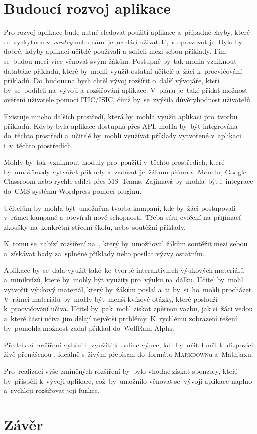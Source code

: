 \documentclass[14pt,a4paper]{article}
\begin{document}
	\section{Budoucí rozvoj aplikace}
        Pro rozvoj aplikace bude nutné sledovat použití aplikace a~případné chyby, které se~vyskytnou v~\emph{sentry} nebo nám~je~nahlásí uživatelé, a~opravovat je.
        Bylo by dobré, kdyby aplikaci učitelé používali a~sdíleli mezi sebou příklady. Tím se~budou moci více věnovat svým žákům. Postupně by~tak mohla vzniknout databáze příkladů, které by~mohli využít ostatní učitelé a~žáci k~procvičování příkladů.
        Do~budoucna bych chtěl vývoj rozšířit o~další vývojáře, kteří by~se~podíleli na~vývoji a~rozšiřování aplikace. V~plánu je~také přidat možnost ověření uživatele pomocí ITIC/ISIC, čímž by~se~zvýšila důvěryhodnost uživatelů.
        
        Existuje mnoho dalších prostředí, která by~mohla využít aplikaci pro~tvorbu příkladů. Kdyby byla aplikace dostupná přes API, mohla by~být integrována do~těchto prostředí a~učitelé by~mohli využívat příklady vytvořené v~aplikaci i~v~těchto prostředích.
        
        Mohly by~tak~vzniknout moduly pro~použití v~těchto prostředích, které by~umožňovaly vytvářet příklady a~zadávat je~žákům přímo v~Moodlu, Google Classroom nebo rychle sdílet přes MS~Teams. Zajímavá by~mohla~být i~integrace do~CMS systému Wordpress pomocí pluginu.

        Učitelům by~mohla být~umožněna tvorba kampaní, kde by~žáci postupovali v~rámci kampaně a~otevírali nové schopnosti. Třeba sérii cvičení na~přijímací zkoušky na~konkrétní střední školu, nebo~soutěžní příklady.
        
        K~tomu se~nabízí rozšíření na~, který by~umožňoval žákům soutěžit mezi sebou a~získávat body za~splněné příklady nebo posílat výzvy ostatním.

        Aplikace by~se~dala využít také~ke~tvorbě interaktivních výukových materiálů a~minikvízů, které by~mohly být využity pro~výuku na~dálku. Učitel by~mohl vytvořit výukový materiál, který by~žákům poslal a~ti~by~si~ho~mohli procházet. V~rámci materiálů by~mohly být~menší kvízové otázky, které poslouží k~procvičování učiva. Učitel by~pak~mohl získat zpětnou vazbu, jak si~žáci vedou a~které části učiva jim dělají největší problémy. K~rychlému zobrazení řešení by~pomohla možnost zadat příklad do~WolfRam Alpha. 
        
        Předchozí rozšíření vybízí k~využítí k~online výuce, kde by~učitel měl~k~dispozici živě přenášenou , ideálně s~živým přepisem do~formátu \textsc{Markdown}u a~Mathjaxu.

        Pro~realizaci výše zmíněných rozšíření by~bylo vhodné získat sponzory, kteří by~přispěli k~vývoji aplikace, což~by~umožnilo věnovat se~vývoji aplikace naplno a~rychleji rozšiřovat její funkce.
	
	\section{Závěr}

    \newpage
    \printbibliography
\end{document}

